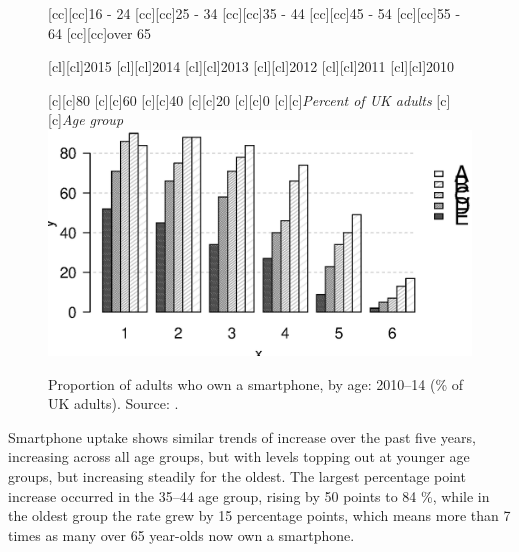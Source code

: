 \documentclass[11 pt, a4paper]{report}
\begin{document}
\begin{figure}[hbtp!]
[cc][cc]{\small{16 - 24}}
[cc][cc]{\small{25 - 34}}
[cc][cc]{\small{35 - 44}}
[cc][cc]{\small{45 - 54}}
[cc][cc]{\small{55 - 64}}
[cc][cc]{\small{over 65}}

[cl][cl]{\small{2015}}
[cl][cl]{\small{2014}}
[cl][cl]{\small{2013}}
[cl][cl]{\small{2012}}
[cl][cl]{\small{2011}}
[cl][cl]{\small{2010}}

[c][c]{\small{80}}
[c][c]{\small{60}}
[c][c]{\small{40}}
[c][c]{\small{20}}
[c][c]{\small{0}}
[c][c]{\small{\emph{Percent of UK adults}}}
[c][c]{\small{\emph{Age group}}}
\includegraphics[width=\textwidth]{../figures/Fig7.5.eps}
\caption{Proportion of adults who own a smartphone, by age: 2010--14 (\% of UK adults). Source: \citet{Ofco2015b}.}\label{Fig:22}%
\end{figure}

Smartphone uptake shows similar trends of increase over the past five years, increasing across all age groups, but with levels topping out at younger age groups, but increasing steadily for the oldest. The largest percentage point increase occurred in the 35--44 age group, rising by 50 points to 84 \%, while in the oldest group the rate grew by 15 percentage points, which means more than 7 times as many over 65 year-olds now own a smartphone. 
\end{document}
